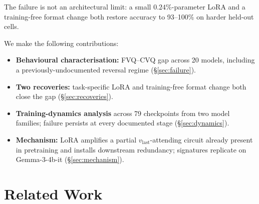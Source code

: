\documentclass[11pt]{article}
\begin{document}
The failure is not an architectural limit: a small
$0.24\%$-parameter LoRA and a training-free format change both
restore accuracy to 93--100\% on harder held-out cells.

We make the following contributions:

\begin{itemize}
\item \textbf{Behavioural characterisation:} FVQ--CVQ gap across 20
  models, including a previously-undocumented reversal regime
  (\S\ref{sec:failure}).
\item \textbf{Two recoveries:} task-specific LoRA and training-free
  format change both close the gap
  (\S\ref{sec:recoveries}).
\item \textbf{Training-dynamics analysis} across 79 checkpoints from
  two model families; failure persists at every documented stage
  (\S\ref{sec:dynamics}).
\item \textbf{Mechanism:} LoRA amplifies a partial
  $v_{\text{last}}$-attending circuit already present in pretraining
  and installs downstream redundancy; signatures replicate on
  Gemma-3-4b-it (\S\ref{sec:mechanism}).
\end{itemize}

\section{Related Work}
\label{sec:related}
\end{document}
